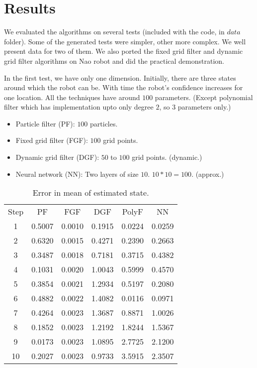 \section{Results}
We evaluated the algorithms on several tests (included with the code, in $data$ folder). Some of the generated tests were simpler, other more complex. We well present data for two of them. We also ported the fixed grid filter and dynamic grid filter algorithms on Nao robot and did the practical demonstration.

In the first test, we have only one dimension. Initially, there are three states around which the robot can be. With time the robot's confidence increases for one location. All the techniques have around $100$ parameters. (Except polynomial filter which has implementation upto only degree $2$, so $3$ parameters only.)
\begin{itemize}
	\item Particle filter (PF): $100$ particles.
	\item Fixed grid filter (FGF): $100$ grid points.
	\item Dynamic grid filter (DGF): $50$ to $100$ grid points. (dynamic.)
	\item Neural network (NN): Two layers of size $10$. $10*10=100$. (approx.)
\end{itemize}

\begin{table}
\caption{Error in mean of estimated state.}	
\begin{center}
\begin{tabular}{ | c || c | c | c | c | c | }
Step & PF & FGF & DGF & PolyF & NN \\
1 & 0.5007 & 0.0010 & 0.1915 & 0.0224 & 0.0259 \\  
2 & 0.6320 & 0.0015 & 0.4271 & 0.2390 & 0.2663 \\  
3 & 0.3487 & 0.0018 & 0.7181 & 0.3715 & 0.4382 \\  
4 & 0.1031 & 0.0020 & 1.0043 & 0.5999 & 0.4570 \\  
5 & 0.3854 & 0.0021 & 1.2934 & 0.5197 & 0.2080 \\  
6 & 0.4882 & 0.0022 & 1.4082 & 0.0116 & 0.0971 \\  
7 & 0.4264 & 0.0023 & 1.3687 & 0.8871 & 1.0026 \\  
8 & 0.1852 & 0.0023 & 1.2192 & 1.8244 & 1.5367 \\  
9 & 0.0173 & 0.0023 & 1.0895 & 2.7725 & 2.1200 \\  
10 & 0.2027 & 0.0023 & 0.9733 & 3.5915 & 2.3507 
\end{tabular}
\end{center}
\end{table}

